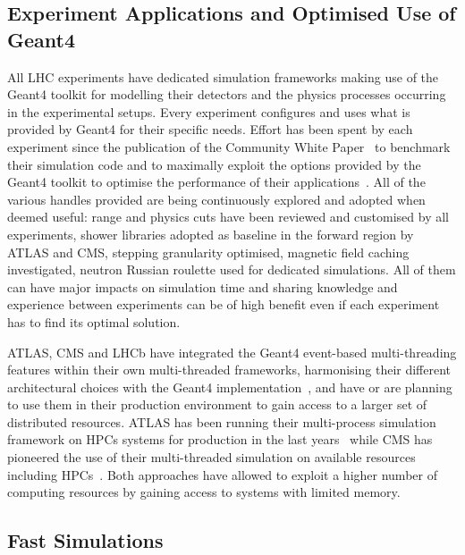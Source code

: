 \documentclass[11pt,a4paper]{article}
\begin{document}
\hypertarget{experiments-applications-and-optimisation-of-the-use-of-geant4}{%
\subsection{Experiment Applications and Optimised Use of
Geant4}\label{experiments-applications-and-optimisation-of-the-use-of-geant4}}

All LHC experiments have dedicated simulation frameworks making use of
the Geant4 toolkit for modelling their detectors and the physics
processes occurring in the experimental setups. Every experiment
configures and uses what is provided by Geant4 for their specific needs.
Effort has been spent by each experiment since the publication of the
Community White Paper~\cite{Albrecht2019, SimFoundation2018hep} to benchmark their 
simulation code and to maximally
exploit the options provided by the Geant4 toolkit to optimise the
performance of their applications~\cite{ATLAS-G4OPT}. All of the various handles provided
are being continuously explored and adopted when deemed useful: range
and physics cuts have been reviewed and customised by all experiments,
shower libraries adopted as baseline in the forward region by ATLAS and
CMS, stepping granularity optimised, magnetic field caching
investigated, neutron Russian roulette used for dedicated simulations.
All of them can have major impacts on simulation time and sharing
knowledge and experience between experiments can be of high benefit even
if each experiment has to find its optimal solution.

ATLAS, CMS and LHCb have integrated the Geant4 event-based
multi-threading features within their own multi-threaded frameworks,
harmonising their different architectural choices with the Geant4
implementation~\cite{CMS02, LHCb01, ATLAS01}, and have or are planning to
use them in their production environment to gain access to a larger set
of distributed resources. ATLAS has been running their multi-process
simulation framework on HPCs systems for production in the
last years~\cite{ATLAS02, Benjamin:2696330} 
while CMS has pioneered the use of their multi-threaded
simulation on available resources including HPCs~\cite{CMS03}. Both
approaches have allowed to exploit a higher number of computing
resources by gaining access to systems with limited memory.

\hypertarget{fast-simulations}{%
\subsection{Fast Simulations}\label{fast-simulations}}
\end{document}
